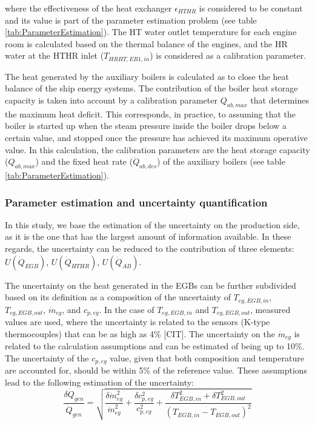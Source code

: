 \documentclass[preprint,12pt]{elsarticle}
\begin{document}
where the effectiveness of the heat exchanger $\epsilon_{HTHR}$ is considered to be constant and its value is part of the parameter estimation problem (see table \ref{tab:ParameterEstimation}). The HT water outlet temperature for each engine room is calculated based on the thermal balance of the engines, and the HR water at the HTHR inlet ($T_{HRHT,ER1,in}$) is considered as a calibration parameter. 

The heat generated by the auxiliary boilers is calculated as to close the heat balance of the ship energy systems. The contribution of the boiler heat storage capacity is taken into account by a calibration parameter $Q_{ab,max}$ that determines the maximum heat deficit. This corresponds, in practice, to assuming that the boiler is started up when the steam pressure inside the boiler drops below a certain value, and stopped once the pressure has achieved its maximum operative value. In this calculation, the calibration parameters are the heat storage capacity ($Q_{ab,max}$) and the fixed heat rate ($\dot{Q}_{ab,des}$) of the auxiliary boilers (see table \ref{tab:ParameterEstimation}).





\subsubsection{Parameter estimation and uncertainty quantification}

In this study, we base the estimation of the uncertainty on the production side, as it is the one that has the largest amount of information available. In these regards, the uncertainty can be reduced to the contribution of three elements: $U(\dot{Q}_{EGB})$, $U(\dot{Q}_{HTHR})$, $U(\dot{Q}_{AB})$.

The uncertainty on the heat generated in the EGBs can be further subdivided based on its definition as a composition of the uncertainty of $T_{eg,EGB,in}$, $T_{eg,EGB,out}$, $\dot{m}_{eg}$, and $c_{p,eg}$. In the case of $T_{eg,EGB,in}$ and $T_{eg,EGB,out}$, measured values are used, where the uncertainty is related to the sensors (K-type thermocouples) that can be as high as 4\% [CIT]. The uncertainty on the $\dot{m}_{eg}$ is related to the calculation assumptions and can be estimated of being up to 10\%. The uncertainty of the $c_{p,eg}$ value, given that both composition and temperature are accounted for, should be within 5\% of the reference value. These assumptions lead to the following estimation of the uncertainty:
\begin{equation}
\frac{\delta \dot{Q}_{gen}}{\dot{Q}_{gen}} = \sqrt{\frac{\delta \dot{m}_{eg}^2}{\dot{m}_{eg}^2} + \frac{\delta c_{p,eg}^2}{c_{p,eg}^2} + \frac{\delta T_{EGB,in}^2 + \delta T_{EGB,out}^2}{(T_{EGB,in} - T_{EGB,out})^2}}
\end{equation}
\end{document}
